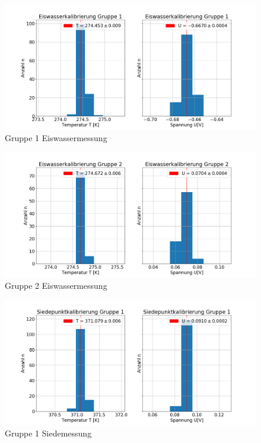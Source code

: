 \documentclass[a4paper, 11pt]{article}
\begin{document}
\begin{center}

\begin{figure}[H]
	\includegraphics[scale=0.4]{Bilder/Gruppe1_Eiswasser.png}%
	\caption[Gruppe 1 Eiswassermessung]{Gruppe 1 Eiswassermessung}%
	\label{pic:Abbildung 2}%
\end{figure}

\begin{figure}[H]
	\includegraphics[scale=0.4]{Bilder/Gruppe2_Eiswasser.png}%
	\caption[Gruppe 2 Eiswassermessung]{Gruppe 2 Eiswassermessung}%
	\label{pic:Abbildung 2}%
\end{figure}

\begin{figure}[H]
	\includegraphics[scale=0.4]{Bilder/Gruppe1_kochendesWasser.png}%
	\caption[Gruppe 1 Siedemessung]{Gruppe 1 Siedemessung}%
	\label{pic:Abbildung 2}%
\end{figure}


\end{center}
\end{document}
